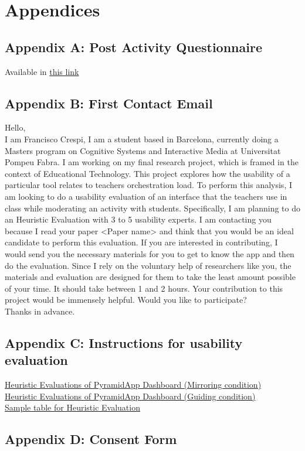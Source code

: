 
\chapter{Appendices}
\section{Appendix A: Post Activity Questionnaire}
Available in \href{https://www.notion.so/Thesis-V7-243ce3de3fbf40c5bf4bcff946624b5d#55078b471e644637a39bef2929872804}{this link}
\section{Appendix B: First Contact Email} 
Hello,\\
I am Francisco Crespi, I am a student based in Barcelona, currently doing a Master\textquotesingle s program on Cognitive Systems and Interactive Media at Universitat Pompeu Fabra. I am working on my final research project, which is framed in the context of Educational Technology. 
This project explores how the usability of a particular tool relates to teacher\textquotesingle s orchestration load. To perform this analysis, I am looking to do a usability evaluation of an interface that the teachers use in class while moderating an activity with students. Specifically, I am planning to do an Heuristic Evaluation with 3 to 5 usability experts. I am contacting you because I read your paper <Paper name> and think that you would be an ideal candidate to perform this evaluation. 
If you are interested in contributing, I would send you the necessary materials for you to get to know the app and then do the evaluation. Since I rely on the voluntary help of researchers like you, the materials and evaluation are designed for them to take the least amount possible of your time. It should take between 1 and 2 hours.
Your contribution to this project would be immensely helpful. Would you like to participate?\\
Thanks in advance.
\section{Appendix C: Instructions for usability evaluation}
\href{https://www.notion.so/Heuristic-Evaluations-of-PyramidApp-Dashboard-Mirroring-condition-fbf0d58ca48a47b89eb0fcb131b7f251}{Heuristic Evaluations of PyramidApp Dashboard (Mirroring condition)}\\
\href{https://www.notion.so/Heuristic-Evaluations-of-PyramidApp-Dashboard-Guiding-condition-306f4aa82cc6416eb43bc873efc3f1cf}{Heuristic Evaluations of PyramidApp Dashboard (Guiding condition)}\\
\href{https://www.notion.so/Thesis-V7-243ce3de3fbf40c5bf4bcff946624b5d#90149a84e369459798acd53bd175f024}{Sample table for Heuristic Evaluation}
\section{Appendix D: Consent Form}

\newpage
